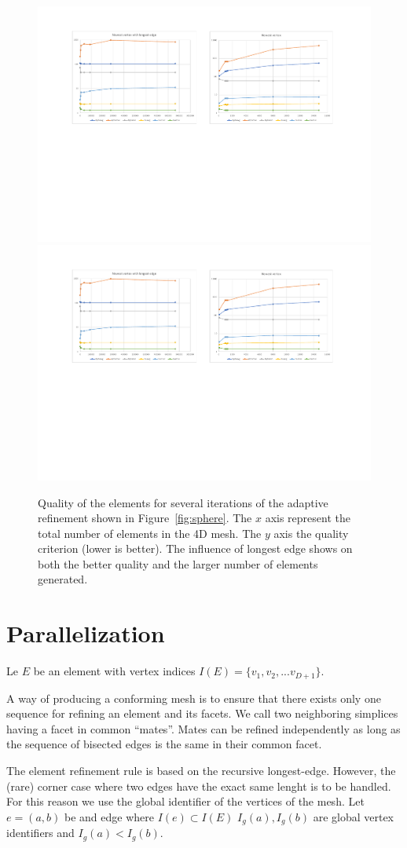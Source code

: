 \documentclass{article}
\begin{document}
\begin{figure}[htbp]
	\centering
	\includegraphics[width=0.48\linewidth]{figures/NewestVertex_Recursive} \hfill
	\includegraphics[width=0.48\linewidth]{figures/NewestVertex_and_LongestEdge_Recursive} 

	\caption{Quality of the elements for several iterations of the adaptive refinement shown in Figure~\ref{fig:sphere}. The $x$ axis represent the total number of elements in the 4D mesh. The $y$ axis the quality criterion (lower is better). The influence of longest edge shows on both the better quality and the larger number of elements generated.}
	\label{fig:quality_nv}
\end{figure}


\clearpage

\section{Parallelization}

Le $E$ be an element with vertex indices $I(E) = \{v_1, v_2, ... v_{D+1} \}$.

A way of producing a conforming mesh is to ensure that there exists only one sequence for refining an 
element and its facets. We call two neighboring simplices having a facet in common ``mates''.
Mates can be refined independently as long as the sequence of bisected edges is the same in their
common facet. 


The element refinement rule is based on the recursive longest-edge. However, the (rare) corner case where two edges have the exact same lenght is to be handled. For this reason we use the global identifier of the vertices of the mesh.
Let $e = (a, b)$ be and edge where $I(e) \subset I(E)$ $I_g(a), I_g(b)$ are global vertex identifiers and $I_g(a) < I_g(b)$. 
\end{document}
